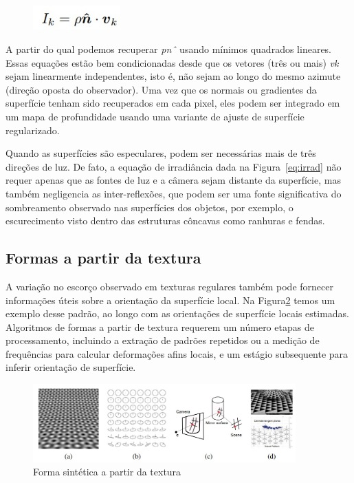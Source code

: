 \documentclass{article}
\begin{document}
\begin{figure}[!htb]
    \centering
    \includegraphics[width=0.3\textwidth]{equacao5.jpg}
    \label{eq:estereo}
\end{figure}

A partir do qual podemos recuperar \textit{pnˆ} usando mínimos quadrados lineares. Essas equações estão bem condicionadas desde que os vetores (três ou mais) \textit{vk} sejam linearmente independentes, isto é, não sejam
ao longo do mesmo azimute (direção oposta do observador). Uma vez que os normais ou gradientes da superfície tenham sido recuperados em cada pixel, eles podem ser integrado em um mapa de profundidade usando uma variante de ajuste de superfície regularizado. 

Quando as superfícies são especulares, podem ser necessárias mais de três direções de luz. De fato,
a equação de irradiância dada na Figura~\ref{eq:irrad} não requer apenas que as fontes de luz e a câmera sejam
distante da superfície, mas também negligencia as inter-reflexões, que podem ser uma fonte significativa
do sombreamento observado nas superfícies dos objetos, por exemplo, o escurecimento visto dentro das estruturas côncavas como ranhuras e fendas.

\subsection{Formas a partir da textura}

A variação no escorço observado em texturas regulares também pode fornecer informações úteis sobre a orientação da superfície local. Na Figura\ref{fig:textura} temos um exemplo desse padrão, ao longo
com as orientações de superfície locais estimadas. Algoritmos de formas a partir de textura requerem um número
etapas de processamento, incluindo a extração de padrões repetidos ou a medição de frequências para calcular deformações afins locais, e um estágio subsequente para inferir orientação de superfície.

\begin{figure}[!htb]
    \centering
    \includegraphics[width=0.9\textwidth]{imagem2.jpg}
    \caption{Forma sintética a partir da textura}
    \label{fig:textura}
\end{figure}
\end{document}
